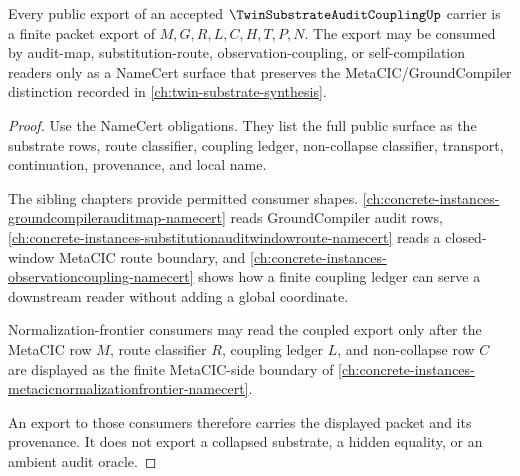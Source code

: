 \begin{theorem}
\label{thm:twin-substrate-audit-coupling-public-export}
Every public export of an accepted $\TwinSubstrateAuditCouplingUp$ carrier is a finite packet export of $M,G,R,L,C,H,T,P,N$. The export may be consumed by audit-map, substitution-route, observation-coupling, or self-compilation readers only as a NameCert surface that preserves the MetaCIC/GroundCompiler distinction recorded in \autoref{ch:twin-substrate-synthesis}.
\end{theorem}
\begin{proof}
Use the NameCert obligations. They list the full public surface as the substrate rows, route classifier, coupling ledger, non-collapse classifier, transport, continuation, provenance, and local name.

The sibling chapters provide permitted consumer shapes. \autoref{ch:concrete-instances-groundcompilerauditmap-namecert} reads GroundCompiler audit rows, \autoref{ch:concrete-instances-substitutionauditwindowroute-namecert} reads a closed-window MetaCIC route boundary, and \autoref{ch:concrete-instances-observationcoupling-namecert} shows how a finite coupling ledger can serve a downstream reader without adding a global coordinate.

Normalization-frontier consumers may read the coupled export only after the MetaCIC row $M$, route classifier $R$, coupling ledger $L$, and non-collapse row $C$ are displayed as the finite MetaCIC-side boundary of \autoref{ch:concrete-instances-metacicnormalizationfrontier-namecert}.

An export to those consumers therefore carries the displayed packet and its provenance. It does not export a collapsed substrate, a hidden equality, or an ambient audit oracle.
\end{proof}


